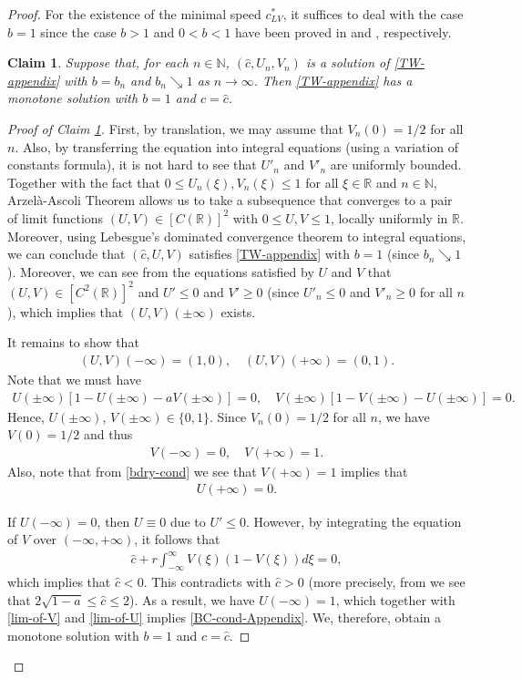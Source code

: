 \documentclass[11pt,a4paper]{article}
\newtheorem{claim}[theorem]{\textbf{Claim}}
\numberwithin{equation}{section}
\numberwithin{figure}{section}
\newcommand\bea{\begin{eqnarray}}
\newcommand\eea{\end{eqnarray}}
\newcommand\beaa{\begin{eqnarray*}}
\newcommand\eeaa{\end{eqnarray*}}
\begin{document}
\begin{proof}
For the existence of the minimal speed $c_{LV}^{*}$, it suffices to deal with the case $b=1$ since the case $b>1$ and $0<b<1$ have been proved in \cite{Kan-on1997} and \cite[Example 4.2]{Lewis Li Weinberger 2}, respectively.

\medskip
\begin{claim}\label{claim 1 AP}
Suppose that, for each $n\in \mathbb{N}$, $(\hat{c}, U_n, V_n)$ is a solution of \eqref{TW-appendix} with $b=b_n$ and
$b_n\searrow 1$ as $n\to\infty$. Then
\eqref{TW-appendix} has a monotone solution with $b=1$ and $c=\hat{c}$.
\end{claim}
\begin{proof}[Proof of Claim \ref{claim 1 AP}]
First, by translation, we may assume that $V_n(0)=1/2$ for all $n$. Also, by transferring the equation into integral equations (using a variation of constants formula),
it is not hard to see that $U'_n$ and  $V'_n$ are uniformly bounded. Together with the fact that
$0\leq U_n(\xi), V_n(\xi)\leq 1$ for all $\xi\in\mathbb{R}$
and $n\in\mathbb{N}$, Arzel\`{a}-Ascoli Theorem allows us to take a subsequence that converges to a pair of limit functions $(U,V)\in [C(\mathbb{R})]^2$ with
$0\leq U,V\leq 1$, locally uniformly in $\mathbb{R}$. Moreover,
using Lebesgue's dominated convergence theorem to integral equations, we can conclude that
$(\hat{c},U,V)$ satisfies \eqref{TW-appendix} with $b=1$ (since $b_n\searrow 1$).
Moreover, we can see from the equations satisfied by $U$ and $V$ that $(U,V)\in [C^2(\mathbb{R})]^2$ and $U'\leq 0$ and $V'\geq0$ (since $U'_n\leq 0$ and $V'_n\geq0$ for all $n$), which implies that $(U,V)(\pm\infty)$ exists.

It remains to show that
\bea\label{BC-cond-Appendix}
(U,V)(-\infty)=(1,0),\quad  (U,V)(+\infty)=(0,1).
\eea
 Note that we must have
\bea\label{bdry-cond}
U(\pm\infty)[1-U(\pm\infty)-aV(\pm\infty)]=0,\quad V(\pm\infty)[1-V(\pm\infty)-U(\pm\infty)]=0.
\eea
Hence, $U(\pm\infty)$, $V(\pm\infty)\in\{0,1\}$. Since $V_n(0)=1/2$ for all $n$, we have $V(0)=1/2$ and thus
\bea\label{lim-of-V}
V(-\infty)=0,\quad V(+\infty)=1.
\eea
Also, note that from \eqref{bdry-cond} we see that $V(+\infty)=1$ implies that
\bea\label{lim-of-U}
U(+\infty)=0.
\eea

If $U(-\infty)=0$, then $U\equiv0$ due to $U'\leq 0$. However, by integrating the equation of $V$ over $(-\infty,+\infty)$,
it follows that
\beaa
\hat{c}+r\int_{-\infty}^{\infty}V(\xi)(1-V(\xi))d\xi=0,
\eeaa
which implies that $\hat{c}<0$. This contradicts with $\hat{c}>0$
(more precisely, from \cite{Kan-on1997} we see that $2\sqrt{1-a}\leq \hat{c}\leq 2$).
As a result, we have $U(-\infty)=1$, which together with \eqref{lim-of-V} and \eqref{lim-of-U} implies
\eqref{BC-cond-Appendix}.
We, therefore, obtain a monotone solution with $b=1$ and $c=\hat{c}$.
\end{proof}



\end{proof}
\end{document}
